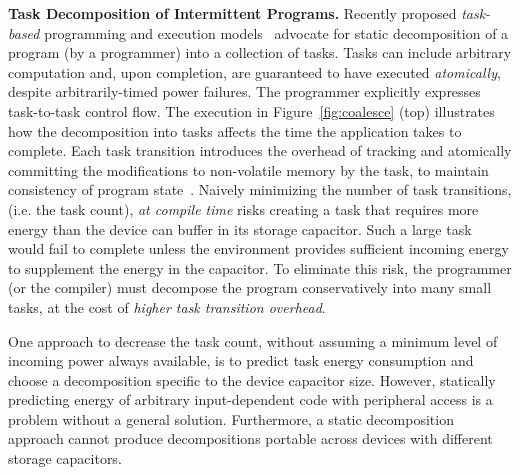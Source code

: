 \textbf{Task Decomposition of Intermittent Programs.} Recently proposed {\em
task-based} programming and execution models~\cite{alpaca,chain} advocate for
static decomposition of a program (by a programmer) into a collection of tasks.
Tasks can include arbitrary computation and, upon completion, are guaranteed to
have executed {\em atomically}, despite arbitrarily-timed power failures.
The programmer explicitly expresses task-to-task control flow. The execution
in Figure~\ref{fig:coalesce} (top) illustrates how the decomposition into
tasks affects the time the application takes to complete. Each task transition introduces the overhead of tracking and atomically committing the modifications to non-volatile memory by the task, to maintain consistency of program state~\cite{chain,alpaca}. Naively minimizing the number of task transitions, (i.e. the task count), \emph{at compile time} risks creating a task that requires more energy than the device can buffer in its storage capacitor. Such a large task would fail to complete unless the environment provides
sufficient incoming energy to supplement the energy in the capacitor. To eliminate this risk, the programmer (or the compiler) must decompose the program conservatively into many small tasks, at the cost of \emph{higher task transition overhead}.

One approach to decrease the task count, without assuming a minimum level of
incoming power always available, is to predict task energy consumption and
choose a decomposition specific to the device capacitor size. However, statically predicting energy of arbitrary input-dependent code with peripheral access is a problem without a general solution. Furthermore, a static decomposition approach cannot produce decompositions portable across devices with different storage capacitors.

